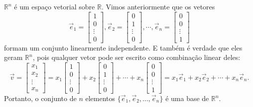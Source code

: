 \documentclass[../livro.tex]{subfiles}  %
\begin{document}
\begin{example}
	$\mathbb{R}^n$ é um espaço vetorial sobre $\mathbb{R}$. Vimos anteriormente que os vetores
	\begin{equation}
	\vec{e}_1 =
	\left[
	\begin{array}{c}
	1 \\
	0 \\
	\vdots \\
	0
	\end{array}
	\right], \vec{e}_2 =
	\left[
	\begin{array}{c}
	0 \\
	1 \\
	\vdots \\
	0
	\end{array}
	\right], \cdots, \vec{e}_n =
	\left[
	\begin{array}{c}
	0 \\
	0 \\
	\vdots \\
	1
	\end{array}
	\right]
	\end{equation} formam um conjunto linearmente independente. E também é verdade que eles geram $\mathbb{R}^n$, pois qualquer vetor pode ser escrito como combinação linear deles:
	\begin{equation}
	\vec{v} =
	\left[
	\begin{array}{c}
	x_1 \\
	x_2 \\
	\vdots \\
	x_n
	\end{array}
	\right] = x_1
	\left[
	\begin{array}{c}
	1 \\
	0 \\
	\vdots \\
	0
	\end{array}
	\right] + x_2
	\left[
	\begin{array}{c}
	0 \\
	1 \\
	\vdots \\
	0
	\end{array}
	\right] + \cdots + x_n
	\left[
	\begin{array}{c}
	0 \\
	0 \\
	\vdots \\
	1
	\end{array}
	\right] = x_1 \vec{e}_1 + x_2 \vec{e}_2 + \cdots + x_n \vec{e}_n.
	\end{equation} Portanto, o conjunto de $n$ elementos $\{\vec{e}_1, \vec{e}_2, \dots, \vec{e}_n\}$ é uma base de $\mathbb{R}^n$.
\end{example}
\end{document}
